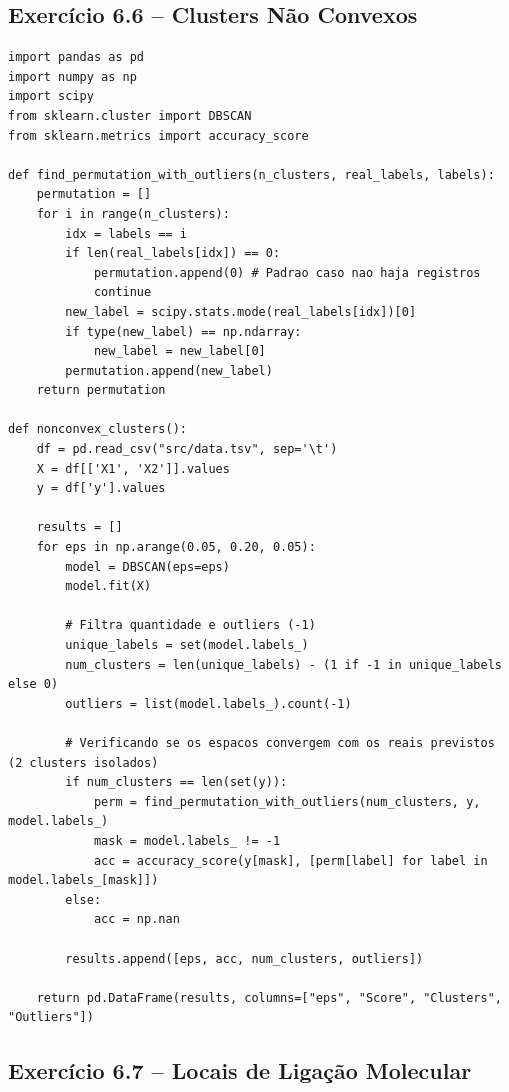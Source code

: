 \documentclass[11pt,a4paper]{article}
\begin{document}
\subsection*{Exercício 6.6 -- Clusters Não Convexos}

\begin{solucao}
\begin{lstlisting}
import pandas as pd
import numpy as np
import scipy
from sklearn.cluster import DBSCAN
from sklearn.metrics import accuracy_score

def find_permutation_with_outliers(n_clusters, real_labels, labels):
    permutation = []
    for i in range(n_clusters):
        idx = labels == i
        if len(real_labels[idx]) == 0:
            permutation.append(0) # Padrao caso nao haja registros
            continue
        new_label = scipy.stats.mode(real_labels[idx])[0]
        if type(new_label) == np.ndarray:
            new_label = new_label[0]
        permutation.append(new_label)
    return permutation

def nonconvex_clusters():
    df = pd.read_csv("src/data.tsv", sep='\t')
    X = df[['X1', 'X2']].values
    y = df['y'].values
    
    results = []
    for eps in np.arange(0.05, 0.20, 0.05):
        model = DBSCAN(eps=eps)
        model.fit(X)
        
        # Filtra quantidade e outliers (-1)
        unique_labels = set(model.labels_)
        num_clusters = len(unique_labels) - (1 if -1 in unique_labels else 0)
        outliers = list(model.labels_).count(-1)
        
        # Verificando se os espacos convergem com os reais previstos (2 clusters isolados)
        if num_clusters == len(set(y)):
            perm = find_permutation_with_outliers(num_clusters, y, model.labels_)
            mask = model.labels_ != -1
            acc = accuracy_score(y[mask], [perm[label] for label in model.labels_[mask]])
        else:
            acc = np.nan
            
        results.append([eps, acc, num_clusters, outliers])
        
    return pd.DataFrame(results, columns=["eps", "Score", "Clusters", "Outliers"])
\end{lstlisting}
\end{solucao}

\subsection*{Exercício 6.7 -- Locais de Ligação Molecular}
\end{document}
